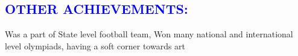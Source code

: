 \documentclass{article}
\begin{document}
\begin{multicols}{2}
\vspace{5pt}
\section*{\large{\textcolor{blue}{\uppercase{Other achievements:}}}}

\begin{flushleft}
	Was a part of State level football team, Won many national and international level olympiads, having a soft corner towards art
\end{flushleft}
\vspace{5pt}

\end{multicols}
\end{document}
